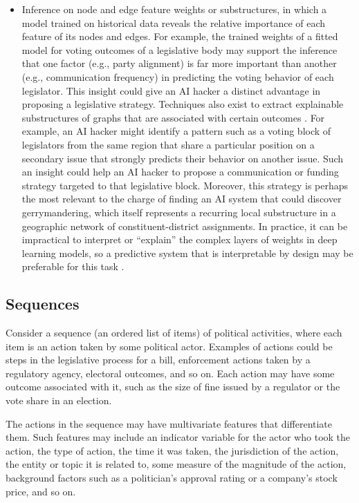 \documentclass[nonacm,12pt]{acmart}
\begin{document}
\begin{itemize}
\item Inference on node and edge feature weights or substructures, in which a model trained on historical data reveals the relative importance of each feature of its nodes and edges.  
For example, the trained weights of a fitted model for voting outcomes of a legislative body may support the inference that one factor (e.g., party alignment) is far more important than another (e.g., communication frequency) in predicting the voting behavior of each legislator. 
This insight could give an AI hacker a distinct advantage in proposing a legislative strategy.
Techniques also exist to extract explainable substructures of graphs that are associated with certain outcomes \cite{yuan_explainability_2021}. 
For example, an AI hacker might identify a pattern such as a voting block of legislators from the same region that share a particular position on a secondary issue that strongly predicts their behavior on another issue.
Such an insight could help an AI hacker to propose a communication or funding strategy targeted to that legislative block.
Moreover, this strategy is perhaps the most relevant to the charge of finding an AI system that could discover gerrymandering, which itself represents a recurring local substructure in a geographic network of constituent-district assignments.
In practice, it can be impractical to interpret or ``explain'' the complex layers of weights in deep learning models, so a predictive system that is interpretable by design may be preferable for this task \cite{rudin_stop_2019}.

\end{itemize}

\subsection{Sequences}

Consider a sequence (an ordered list of items) of political activities, where each item is an action taken by some political actor.  Examples of actions could be steps in the legislative process for a bill, enforcement actions taken by a regulatory agency, electoral outcomes, and so on.  Each action may have some outcome associated with it, such as the size of fine issued by a regulator or the vote share in an election.

The actions in the sequence may have multivariate features that differentiate them. 
Such features may include an indicator variable for the actor who took the action, the type of action, the time it was taken, the jurisdiction of the action, the entity or topic it is related to, some measure of the magnitude of the action, background factors such as a politician's approval rating or a company's stock price, and so on.  
\end{document}
